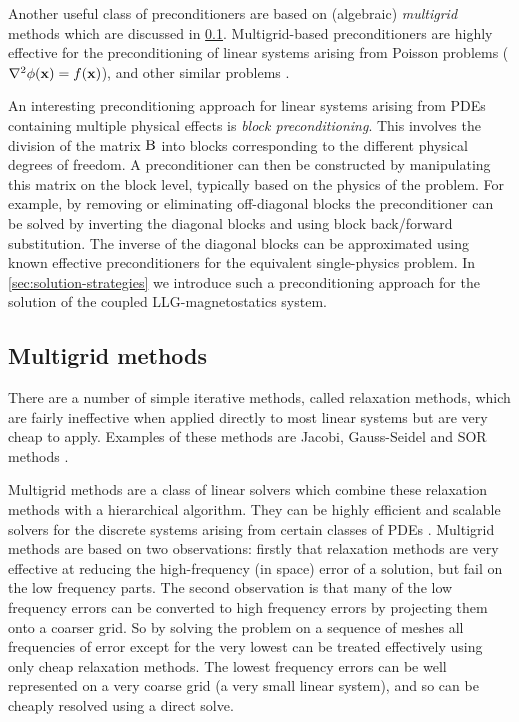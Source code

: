 Another useful class of preconditioners are based on (algebraic) \emph{multigrid} methods which are discussed in \cref{sec:multigrid-methods}.
Multigrid-based preconditioners are highly effective for the preconditioning of linear systems arising from Poisson problems (\ie $\nabla^2 \phi(\boldsymbol{\mathrm{x}}) = f(\boldsymbol{\mathrm{x}})$), and other similar problems \cite{Henson2002}.

An interesting preconditioning approach for linear systems arising from PDEs containing multiple physical effects is \emph{block preconditioning}.
This involves the division of the matrix $\mathrm{B}$ into blocks corresponding to the different physical degrees of freedom.
A preconditioner can then be constructed by manipulating this matrix on the block level, typically based on the physics of the problem.
For example, by removing or eliminating off-diagonal blocks the preconditioner can be solved by inverting the diagonal blocks and using block back/forward substitution.
The inverse of the diagonal blocks can be approximated using known effective preconditioners for the equivalent single-physics problem.
In \cref{sec:solution-strategies} we introduce such a preconditioning approach for the solution of the coupled LLG-magnetostatics system.



\subsection{Multigrid methods}
\label{sec:multigrid-methods}

There are a number of simple iterative methods, called relaxation methods, which are fairly ineffective when applied directly to most linear systems but are very cheap to apply.
Examples of these methods are Jacobi, Gauss-Seidel and SOR methods \cite[103]{Saad2000}.

Multigrid methods are a class of linear solvers which combine these relaxation methods with a hierarchical algorithm.
They can be highly efficient and scalable solvers for the discrete systems arising from certain classes of PDEs \cite{multigrid-tut}.
Multigrid methods are based on two observations: firstly that relaxation methods are very effective at reducing the high-frequency (in space) error of a solution, but fail on the low frequency parts.
The second observation is that many of the low frequency errors can be converted to high frequency errors by projecting them onto a coarser grid.
So by solving the problem on a sequence of meshes all frequencies of error except for the very lowest can be treated effectively using only cheap relaxation methods.
The lowest frequency errors can be well represented on a very coarse grid (\ie a very small linear system), and so can be cheaply resolved using a direct solve.

